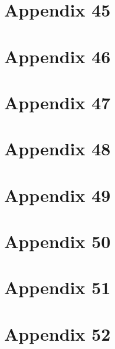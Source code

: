 \chapter{Appendix 45}

\chapter{Appendix 46}

\chapter{Appendix 47}

\chapter{Appendix 48}

\chapter{Appendix 49}

\chapter{Appendix 50}

\chapter{Appendix 51}

\chapter{Appendix 52}
